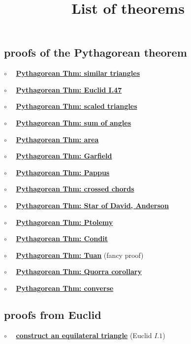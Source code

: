 \documentclass[11pt, oneside]{article}
\title{List of theorems}
\date{}
\begin{document}
\maketitle
\Large


\subsection*{proofs of the Pythagorean theorem}

$\circ$ \ \ \hyperref[sec:Pythagoras_similar_triangles]{\textbf{Pythagorean Thm:  similar triangles}}

$\circ$ \ \ \hyperref[sec:Euclid47]{\textbf{Pythagorean Thm: Euclid I.47 }}

$\circ$ \ \ \hyperref[sec:Pythagoras_scaled_triangles]{\textbf{Pythagorean Thm:  scaled triangles}}

$\circ$ \ \ \hyperref[sec:pthm_sum_angles]{\textbf{Pythagorean Thm:  sum of angles}}

$\circ$ \ \ \hyperref[sec:Pythagoras_area]{\textbf{Pythagorean Thm:  area}}

$\circ$ \ \ \hyperref[sec:Garfield]{\textbf{Pythagorean Thm: Garfield }}

$\circ$ \ \ \hyperref[sec:PProof_Pappus]{\textbf{Pythagorean Thm:  Pappus}}

$\circ$ \ \ \hyperref[sec:PProof_chords]{\textbf{Pythagorean Thm:  crossed chords}}

$\circ$ \ \ \hyperref[sec:star_of_david]{\textbf{Pythagorean Thm:  Star of David, Anderson}}

$\circ$ \ \ \hyperref[sec:PProof_Ptolemy]{\textbf{Pythagorean Thm: Ptolemy }}

$\circ$ \ \ \hyperref[sec:Condit]{\textbf{Pythagorean Thm:  Condit}}

$\circ$ \ \ \hyperref[sec:Pthm_Tuan]{\textbf{Pythagorean Thm:  Tuan}} (fancy proof)

$\circ$ \ \ \hyperref[sec:Quorra]{\textbf{Pythagorean Thm:  Quorra corollary}}

$\circ$ \ \ \hyperref[sec:Pythagorean_theorem_converse]{\textbf{Pythagorean Thm:  converse}}


\subsection*{proofs from Euclid}

$\circ$ \ \ \hyperref[sec:Euclid1]{\textbf{construct an equilateral triangle}} (Euclid $I.1$)
\end{document}

